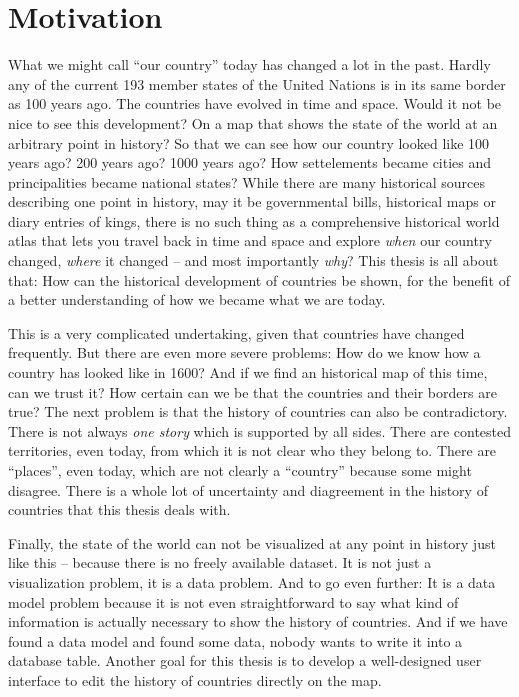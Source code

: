\section{Motivation} %
\label{sec:motivation}

What we might call ``our country'' today has changed a lot in the past. Hardly any of the current 193 member states of the United Nations is in its same border as 100 years ago. The countries have evolved in time and space. Would it not be nice to see this development? On a map that shows the state of the world at an arbitrary point in history? So that we can see how our country looked like 100 years ago? 200 years ago? 1000 years ago? How settelements became cities and principalities became national states? While there are many historical sources describing one point in history, may it be governmental bills, historical maps or diary entries of kings, there is no such thing as a comprehensive historical world atlas that lets you travel back in time and space and explore \emph{when} our country changed, \emph{where} it changed -- and most importantly \emph{why}? This thesis is all about that: How can the historical development of countries be shown, for the benefit of a better understanding of how we became what we are today.

This is a very complicated undertaking, given that countries have changed frequently. But there are even more severe problems: How do we know how a country has looked like in 1600? And if we find an historical map of this time, can we trust it? How certain can we be that the countries and their borders are true? The next problem is that the history of countries can also be contradictory. There is not always \emph{one story} which is supported by all sides. There are contested territories, even today, from which it is not clear who they belong to. There are ``places'', even today, which are not clearly a ``country'' because some might disagree. There is a whole lot of uncertainty and diagreement in the history of countries that this thesis deals with.

Finally, the state of the world can not be visualized at any point in history just like this -- because there is no freely available dataset. It is not just a visualization problem, it is a data problem. And to go even further: It is a data model problem because it is not even straightforward to say what kind of information is actually necessary to show the history of countries. And if we have found a data model and found some data, nobody wants to write it into a database table. Another goal for this thesis is to develop a well-designed user interface to edit the history of countries directly on the map.

